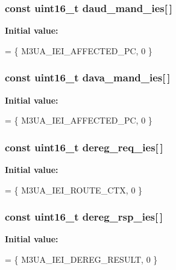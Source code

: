 \subsubsection[{daud\+\_\+mand\+\_\+ies}]{\setlength{\rightskip}{0pt plus 5cm}const uint16\+\_\+t daud\+\_\+mand\+\_\+ies[$\,$]\hspace{0.3cm}{\ttfamily [static]}}\label{m3ua_8c_ad33ebb95b46b68932185e4526ea54271}
{\bfseries Initial value\+:}
\begin{DoxyCode}
= \{
        M3UA_IEI_AFFECTED_PC, 0
\}
\end{DoxyCode}
\subsubsection[{dava\+\_\+mand\+\_\+ies}]{\setlength{\rightskip}{0pt plus 5cm}const uint16\+\_\+t dava\+\_\+mand\+\_\+ies[$\,$]\hspace{0.3cm}{\ttfamily [static]}}\label{m3ua_8c_a432c07a5723749796adf40c709fa03b8}
{\bfseries Initial value\+:}
\begin{DoxyCode}
= \{
        M3UA_IEI_AFFECTED_PC, 0
\}
\end{DoxyCode}
\subsubsection[{dereg\+\_\+req\+\_\+ies}]{\setlength{\rightskip}{0pt plus 5cm}const uint16\+\_\+t dereg\+\_\+req\+\_\+ies[$\,$]\hspace{0.3cm}{\ttfamily [static]}}\label{m3ua_8c_aa2a54b97b5401d9fbee06c136b514201}
{\bfseries Initial value\+:}
\begin{DoxyCode}
= \{
        M3UA_IEI_ROUTE_CTX, 0
\}
\end{DoxyCode}
\subsubsection[{dereg\+\_\+rsp\+\_\+ies}]{\setlength{\rightskip}{0pt plus 5cm}const uint16\+\_\+t dereg\+\_\+rsp\+\_\+ies[$\,$]\hspace{0.3cm}{\ttfamily [static]}}\label{m3ua_8c_a26ac31c60d013259e4c19640287ae22e}
{\bfseries Initial value\+:}
\begin{DoxyCode}
= \{
        M3UA_IEI_DEREG_RESULT, 0
\}
\end{DoxyCode}
